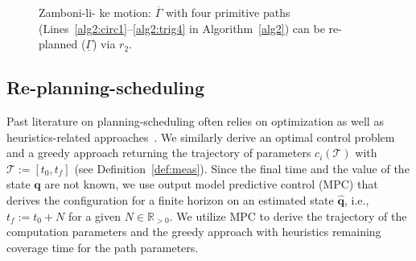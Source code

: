 \documentclass[letterpaper,10pt,journal,twoside]{IEEEtran}
\newcommand{\figpath}{./figures}
\theoremstyle{definition}
\begin{document}
\begin{figure}[t]
  \vspace*{-1ex}
  \footnotesize
  \begin{minipage}[l]{0.7\columnwidth}
    \centering
    
  \end{minipage}\hfill
  \begin{minipage}[l]{0.26\columnwidth}
    \caption{Zamboni-li- ke motion: $\overline{\Gamma}$ with four primitive paths (Lines~\ref{alg2:circ1}--\ref{alg2:trig4} in Algorithm~\ref{alg2}) can be re-planned ($\underline{\Gamma}$) {\color{blue}via} $r_2$.%
    }
    \label{fig:zambo}
  \end{minipage}
  \vspace*{-5ex}
\end{figure}

\subsection{Re-planning-scheduling}
\label{sec:repla-algo}

Past literature on planning-scheduling often relies on %
optimization {\color{blue} as well as heuristics-}related approaches~\cite{brateman2006energy,zhang2007low,ondruska2015scheduled,lahijanian2018resource}. We similarly derive an optimal control problem {\color{blue}and a greedy approach} returning the trajectory of parameters $c_i(\mathcal{T})$ with $\mathcal{T}:=[t_0,t_f]$ (see Definition~\ref{def:meas}). Since the final time %
and the %
value of the state $\mathbf{q}$ are not known, we use %
output model predictive control (MPC) that derives the configuration for a finite horizon on an estimated state $\hat{\mathbf{q}}$, i.e., $t_f:=t_0+N$ for a given $N\in\mathbb{R}_{>0}$.%
{\color{blue} We utilize MPC to derive the trajectory of the computation parameters and the greedy approach with heuristics remaining coverage time for the path parameters.}
\end{document}
